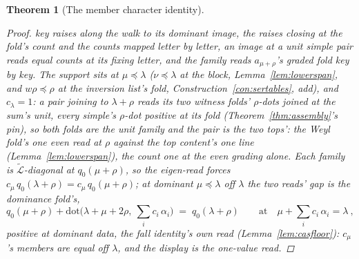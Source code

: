 \documentclass[11pt]{article}
\newtheorem{theorem}{Theorem}
\theoremstyle{definition}
\begin{document}
\begin{theorem}[The member character identity]
\begin{proof}
key raises along the walk to its dominant image, the raises
closing at the fold's count and the counts mapped letter by
letter, an image at a unit simple pair reads equal counts at
its fixing letter, and the family reads $a_{\mu+\rho}$'s
graded fold key by key. The support sits at
$\mu\preceq\lambda$ ($\nu\preceq\lambda$ at the block,
Lemma~\ref{lem:lowerspan}, and $w\rho\preceq\rho$ at the
inversion list's fold, Construction~\ref{con:sertables}, add),
and $c_\lambda=1$: a pair joining to $\lambda+\rho$ reads its
two witness folds' $\rho$-dots joined at the sum's unit, every
simple's $\rho$-dot positive at its fold
(Theorem~\ref{thm:assembly}'s pin), so both folds are the unit
family and the pair is the two tops': the Weyl fold's one even
read at $\rho$ against the top content's one line
(Lemma~\ref{lem:lowerspan}), the count one at the even grading
alone. Each
family is $\tilde{\mathcal L}$-diagonal at $q_0(\mu{+}\rho)$, so the
eigen-read forces $c_\mu\,q_0(\lambda{+}\rho)
=c_\mu\,q_0(\mu{+}\rho)$; at dominant $\mu\preceq\lambda$ off
$\lambda$ the two reads' gap is the dominance fold's,
\[
q_0(\mu{+}\rho)
+\mathrm{dot}\big(\lambda{+}\mu{+}2\rho,\
{\textstyle\sum_i}c_i\,\alpha_i\big)
\;=\;q_0(\lambda{+}\rho)
\qquad\text{at}\quad
\mu+{\textstyle\sum_i}c_i\,\alpha_i=\lambda\ ,
\]
positive at dominant data, the fall identity's own read
(Lemma~\ref{lem:casfloor}): $c_\mu$'s members are equal off
$\lambda$, and the display is the one-value read.
\end{proof}
\end{theorem}
\end{document}
